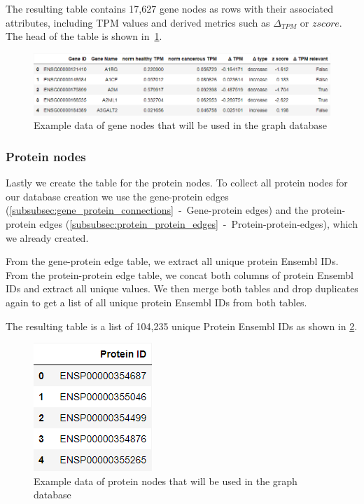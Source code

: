 The resulting table contains 17,627 gene nodes as rows with their associated attributes,
including TPM values and derived metrics such as $\Delta_{TPM}$ or $z score$.
The head of the table is shown in~\cref{fig:03_02_df_gene_nodes}.

\begin{figure}[h]
    \centering
    \includegraphics[height=\dfheight]{figures/03_02_gene_nodes}
    \caption{Example data of gene nodes that will be used in the graph database}
    \label{fig:03_02_df_gene_nodes}
\end{figure}


\subsubsection*{Protein nodes} \label{subsubsec:protein_nodes}
Lastly we create the table for the protein nodes.
To collect all protein nodes for our database creation we use the gene-protein edges (\cref{subsubsec:gene_protein_connections}~-~Gene-protein edges)
and the protein-protein edges (\cref{subsubsec:protein_protein_edges}~-~Protein-protein-edges), which we already created.

From the gene-protein edge table, we extract all unique protein Ensembl IDs.
From the protein-protein edge table, we concat both columns of protein Ensembl IDs and extract all unique values.
We then merge both tables and drop duplicates again to get a list of all unique protein Ensembl IDs from both tables.

The resulting table is a list of 104,235 unique Protein Ensembl IDs as shown in \cref{fig:03_02_df_protein_nodes}.


\begin{figure}[h]
    \centering
    \includegraphics[height=\dfheight]{figures/03_02_protein_nodes}
    \caption{Example data of protein nodes that will be used in the graph database}
    \label{fig:03_02_df_protein_nodes}
\end{figure}